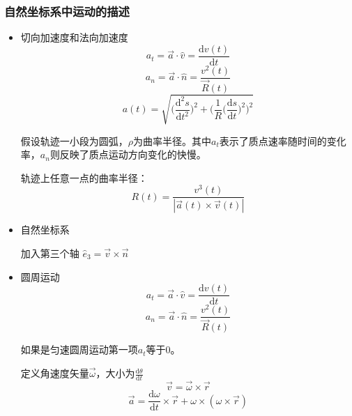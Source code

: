\documentclass[UTF8]{ctexart}
\begin{document}
		\subsubsection{自然坐标系中运动的描述}
			\begin{itemize}
				\item 切向加速度和法向加速度\\
					\begin{equation}
						a_t = \vec{a}\cdot \hat{v} = \frac{\mathrm{d}v(t)}{\mathrm{d}t}
					\end{equation}				
					\begin{equation}
						a_n = \vec{a}\cdot \hat{n} = \frac{v^2(t)}{\vec{R}(t)}
					\end{equation}
					\begin{equation}
						a(t) = \sqrt{\big(\frac{\mathrm{d}^2s}{\mathrm{d}t^2}\big)^2+\big(\frac{1}{R}\big(\frac{\mathrm{d}s}{\mathrm{d}t}\big)^2\big)^2}
					\end{equation}
					\par 假设轨迹一小段为圆弧，$\rho$为曲率半径。其中$a_t$表示了质点速率随时间的变化率，$a_n$则反映了质点运动方向变化的快慢。
					\par 轨迹上任意一点的曲率半径：
					\begin{equation}
						R(t) = \frac{v^3(t)}{|\vec{a}(t)\times\vec{v}(t)|}
					\end{equation}
				\item 自然坐标系
					\par 加入第三个轴 $\hat{e}_3 = \vec{v} \times \vec{n}$
				\item 圆周运动
					\begin{equation}
						a_t = \vec{a}\cdot \hat{v} = \frac{\mathrm{d}v(t)}{\mathrm{d}t}
					\end{equation}				
					\begin{equation}
						a_n = \vec{a}\cdot \hat{n} = \frac{v^2(t)}{\vec{R}(t)}
					\end{equation}
					\par 如果是匀速圆周运动第一项$a_t$等于0。
					\par 定义角速度矢量$\vec{\omega}$，大小为$\frac{\mathrm{d}\theta}{\mathrm{d}t}$
					\begin{equation}
						\vec{v} = \vec{\omega}\times\vec{r}
					\end{equation}
					\begin{equation}
						\vec{a} = \frac{\mathrm{d}\omega}{\mathrm{d}t}\times\vec{r}+\omega\times(\omega\times\vec{r})
					\end{equation}
			\end{itemize}
\end{document}
